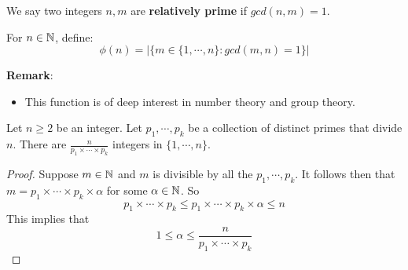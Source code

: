 \begin{definition}
    We say two integers $n,m$ are \textbf{relatively prime} if $gcd(n,m)=1$.
\end{definition}


\begin{definition}
    For $n \in \mathbb{N}$, define:
    $$\phi(n)=|\{m \in \{1,\cdots,n\}: gcd(m,n)=1\}|$$
\end{definition}
\textbf{Remark}:
\begin{itemize}
    \item This function is of deep interest in number theory and group theory.
\end{itemize}


\begin{lemma}
    Let $n \geq 2$ be an integer. Let $p_1,\cdots,p_k$ be a collection of distinct primes that divide $n$. 
    There are $\frac{n}{p_1\times \cdots \times p_k}$ integers in $\{1,\cdots,n\}$.
\end{lemma}
\begin{proof}
    Suppose $m \in \mathbb{N}$ and $m$ is divisible by all the $p_1,\cdots,p_k$. 
    It follows then that $m=p_1 \times \cdots \times p_k\times \alpha$ for some $\alpha \in \mathbb{N}$. So
    $$p_1 \times \cdots \times p_k \leq p_1 \times \cdots \times p_k \times \alpha \leq n$$
    This implies that $$1 \leq \alpha \leq \frac{n}{p_1 \times \cdots \times p_k}$$
\end{proof}

